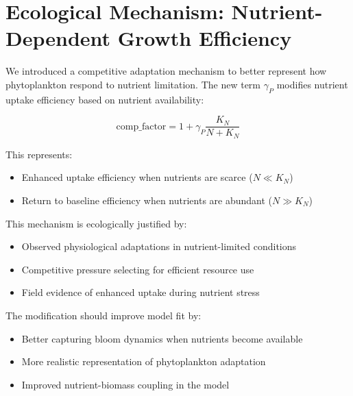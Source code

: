 \section{Ecological Mechanism: Nutrient-Dependent Growth Efficiency}

We introduced a competitive adaptation mechanism to better represent how phytoplankton respond to nutrient limitation. The new term $\gamma_P$ modifies nutrient uptake efficiency based on nutrient availability:

\[
\text{comp\_factor} = 1 + \gamma_P \frac{K_N}{N + K_N}
\]

This represents:
\begin{itemize}
\item Enhanced uptake efficiency when nutrients are scarce ($N \ll K_N$)
\item Return to baseline efficiency when nutrients are abundant ($N \gg K_N$)
\end{itemize}

This mechanism is ecologically justified by:
\begin{itemize}
\item Observed physiological adaptations in nutrient-limited conditions
\item Competitive pressure selecting for efficient resource use
\item Field evidence of enhanced uptake during nutrient stress
\end{itemize}

The modification should improve model fit by:
\begin{itemize}
\item Better capturing bloom dynamics when nutrients become available
\item More realistic representation of phytoplankton adaptation
\item Improved nutrient-biomass coupling in the model
\end{itemize}
